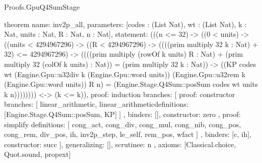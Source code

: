 \begin{lexlean}{Proofs.GpuQ4SumStage}
\begin{semanticmodule}
theorem{
  name: inv2p_all,
  parameters: [codes : (List Nat), wt : (List Nat), k : Nat, units : Nat, R : Nat, n : Nat],
  statement: (((n <= 32) -> ((0 < units) -> ((units < 4294967296) -> ((R < 4294967296) -> ((((prim multiply 32 k : Nat) + 32) <= 4294967296) -> ((((prim multiply (rowOf k units) R : Nat) + (prim multiply 32 (colOf k units) : Nat)) = (prim multiply 32 k : Nat)) -> ((KP codes wt (Engine.Gpu::u32div k (Engine.Gpu::word units)) (Engine.Gpu::u32rem k (Engine.Gpu::word units)) R n) = (Engine.Stage.Q4Sum::posSum codes wt units k n)))))))) <-> (k <= k)),
  proof: induction{
    branches: [
      {
        proof: constructor{
          branches: [
            linear_arithmetic{},
            linear_arithmetic{definitions: [Engine.Stage.Q4Sum::posSum, KP]}
          ]
        },
        binders: [],
        constructor: zero
      },
      {
        proof: simplify{
          definitions: [
            cong_act,
            cong_div,
            cong_mul,
            cong_nib,
            cong_pos,
            cong_rem,
            div_pos,
            ih,
            inv2p_step,
            le_self,
            rem_pos,
            wfact
          ]
        },
        binders: [c, ih],
        constructor: succ
      }
    ],
    generalizing: [],
    scrutinee: n
  },
  axioms: [Classical.choice, Quot.sound, propext]
}


\end{semanticmodule}
\end{lexlean}
